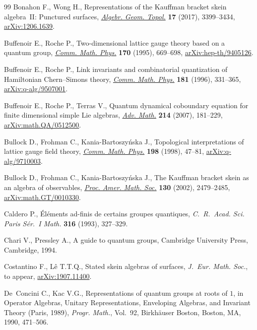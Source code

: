 \documentclass[pdftex]{sigma}%
\numberwithin{equation}{section}
\numberwithin{figure}{section}
\begin{document}
\begin{thebibliography}{99}
Bonahon F., Wong H., Representations of the {K}auffman bracket skein
 algebra~{II}: {P}unctured surfaces, \href{https://doi.org/10.2140/agt.2017.17.3399}{\textit{Algebr. Geom. Topol.}} \textbf{17}
 (2017), 3399--3434, \href{https://arxiv.org/abs/1206.1639}{arXiv:1206.1639}.

Buffenoir E., Roche P., Two-dimensional lattice gauge theory based on a quantum
 group, \href{https://doi.org/10.1007/BF02099153}{\textit{Comm. Math. Phys.}} \textbf{170} (1995), 669--698,
 \href{https://arxiv.org/abs/hep-th/9405126}{arXiv:hep-th/9405126}.

Buffenoir E., Roche P., Link invariants and combinatorial quantization of
 {H}amiltonian {C}hern--{S}imons theory, \href{https://doi.org/10.1007/BF02101008}{\textit{Comm. Math. Phys.}}
 \textbf{181} (1996), 331--365, \href{https://arxiv.org/abs/q-alg/9507001}{arXiv:q-alg/9507001}.

Buffenoir E., Roche P., Terras V., Quantum dynamical coboundary equation for
 finite dimensional simple {L}ie algebras, \href{https://doi.org/10.1016/j.aim.2007.02.001}{\textit{Adv. Math.}} \textbf{214}
 (2007), 181--229, \href{https://arxiv.org/abs/math.QA/0512500}{arXiv:math.QA/0512500}.

Bullock D., Frohman C., Kania-Bartoszy\'nska J., Topological interpretations
 of lattice gauge field theory, \href{https://doi.org/10.1007/s002200050471}{\textit{Comm. Math. Phys.}} \textbf{198}
 (1998), 47--81, \href{https://arxiv.org/abs/q-alg/9710003}{arXiv:q-alg/9710003}.

Bullock D., Frohman C., Kania-Bartoszy\'nska J., The {K}auffman bracket skein
 as an algebra of observables, \href{https://doi.org/10.1090/S0002-9939-02-06323-2}{\textit{Proc. Amer. Math. Soc.}} \textbf{130}
 (2002), 2479--2485, \href{https://arxiv.org/abs/math.GT/0010330}{arXiv:math.GT/0010330}.

Caldero P., \'El\'ements ad-finis de certains groupes quantiques,
 \textit{C.~R.~Acad. Sci. Paris S\'er.~I Math.} \textbf{316} (1993), 327--329.

Chari V., Pressley A., A guide to quantum groups, Cambridge University Press,
 Cambridge, 1994.

Costantino F., L\^e T.T.Q., Stated skein algebras of surfaces, \textit{J.~Eur.
 Math. Soc.}, {t}o appear, \href{https://arxiv.org/abs/1907.11400}{arXiv:1907.11400}.

De~Concini C., Kac V.G., Representations of quantum groups at roots of {$1$},
 in Operator Algebras, Unitary Representations, Enveloping Algebras, and
 Invariant Theory ({P}aris, 1989), \textit{Progr. Math.}, Vol.~92,
 Birkh\"auser Boston, Boston, MA, 1990, 471--506.


\end{thebibliography}
\end{document}
